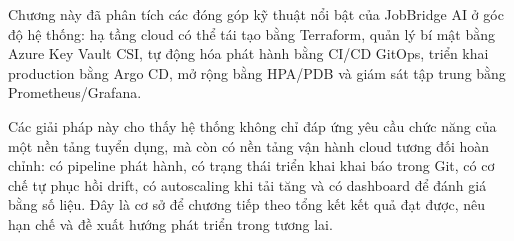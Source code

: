 \documentclass[../DoAn.tex]{subfiles}
\begin{document}
Chương này đã phân tích các đóng góp kỹ thuật nổi bật của JobBridge AI ở góc độ hệ thống: hạ tầng cloud có thể tái tạo bằng Terraform, quản lý bí mật bằng Azure Key Vault CSI, tự động hóa phát hành bằng CI/CD GitOps, triển khai production bằng Argo CD, mở rộng bằng HPA/PDB và giám sát tập trung bằng Prometheus/Grafana.

Các giải pháp này cho thấy hệ thống không chỉ đáp ứng yêu cầu chức năng của một nền tảng tuyển dụng, mà còn có nền tảng vận hành cloud tương đối hoàn chỉnh: có pipeline phát hành, có trạng thái triển khai khai báo trong Git, có cơ chế tự phục hồi drift, có autoscaling khi tải tăng và có dashboard để đánh giá bằng số liệu. Đây là cơ sở để chương tiếp theo tổng kết kết quả đạt được, nêu hạn chế và đề xuất hướng phát triển trong tương lai.
\end{document}
